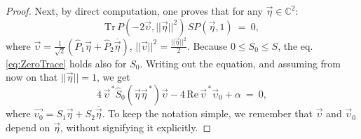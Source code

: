 \documentclass[12pt]{article}
\theoremstyle{plain}
\theoremstyle{definition}
\theoremstyle{remark}
\numberwithin{equation}{section}
\begin{document}
\begin{proof}
Next, by direct computation, one proves that for any
$\vec{\eta} \in \mathbb{C}^{2}$:
\begin{equation}
 \label{eq:ZeroTrace}
 \text{Tr} \, P(-2\vec{\upsilon}, ||\vec{\eta}||^{2}) \, S P(\vec{\eta},1)
     \:=\: 0,
\end{equation}
where $\vec{\upsilon} =
 \frac{1}{\sqrt{2}} \left(
  \hat{P}_{1} \vec{\eta} + \hat{P}_{2} \overline{\vec{\eta}}
 \right)$,
$||\vec{\upsilon}||^{2} = \tfrac{||\vec{\eta}||^{2}}{2}$.
Because $0 \leq S_{0} \leq S$, the eq.
\eqref{eq:ZeroTrace} holds also for $S_{0}$.
Writing out the equation, and assuming from now on that
$||\vec{\eta}|| = 1$,
we get
\begin{equation}
 \label{eq:ZeroTraceExplicit}
 4 \, \vec{\upsilon}^{\,*} \hat{S}_{0}(\vec{\eta} \vec{\eta}^{\,*}) \vec{\upsilon} -
 4 \, \text{Re} \, \vec{\upsilon}^{\,*} \vec{\upsilon}_{0} + \alpha \: = \: 0,
\end{equation}
where $\vec{\upsilon_{0}} = S_{1} \vec{\eta} + S_{2} \overline{\vec{\eta}}$.
To keep the notation simple,
we remember that $\vec{\upsilon}$ and $\vec{\upsilon}_{0}$ depend on $\vec{\eta}$,
without signifying it explicitly.


\end{proof}
\end{document}
